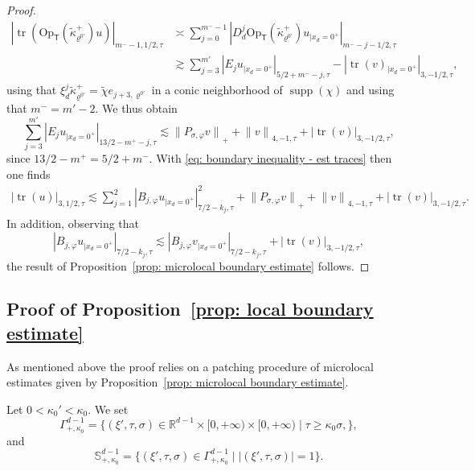 \documentclass[10pt]{amsart}
\let\sep\mid
\theoremstyle{plain}
\theoremstyle{definition}
\def\R{\mathbb{R}}
\newcommand{\nhd}{neighborhood\xspace}
\let\k\kappa
\let\y\varrho
\newcommand{\tk}{\tilde{\kappa}}
\newcommand{\tchi}{\tilde{\chi}}
\newcommand{\br}{\ensuremath{_{|x_d=0^+}}}
\newcommand{\Opt}{\ensuremath{\mathrm{Op}_{\scriptscriptstyle{\mathsf{T}}}}}
\newcommand{\Norm}[2]{{\| #1 \|}_{#2}}
\newcommand{\Normsc}[2]{{\| #1 \|}_{#2, \tau}}
\newcommand{\normsc}[2]{{| #1 |}_{#2, \tau}}
\newcommand{\Pconj}{P_{\sigma,\varphi}}
\DeclareMathOperator{\supp}{supp}
\DeclareMathOperator{\trace}{tr}
\begin{document}
\begin{proof}
\begin{align*}
\normsc{\trace(\Opt(\tk^+_{\y^{0\prime}}) u)}{m^--1, 1/2}
& \asymp \sum_{j=0}^{m^--1}
\normsc{D_d^j \Opt(\tk^+_{\y^{0\prime}}) u\br}{m^--j- 1/2}\\[-5pt]
& \gtrsim \sum_{j=3}^{m'}
\normsc{E_j u\br}{5/2+ m^--j} - \normsc{\trace(v)\br}{3, - 1/2} ,
\end{align*}
using that $\xi_d^j \tk^+_{\y^{0\prime}} = \tchi e_{j+3,
\y^{0\prime}}$ in a conic \nhd of $\supp(\chi)$ and using that
$m^- = m'-2$.
We thus obtain\vspace*{-3pt}
\begin{equation*}
\sum_{j=3}^{m'} \normsc{E_{j}u\br}{13/2-m^+-j}
\lesssim
\Norm{\Pconj v}{+}
+ \Normsc{v}{4,-1}
+ \normsc{\trace(v)}{3,-1/2},
\end{equation*}
since $13/2-m^+ = 5/2+ m^-$.
With \eqref{eq: boundary inequality - est traces} then one finds\vspace*{-3pt}
\begin{align*}
\normsc{\trace(u)}{3,1/2}
\lesssim \sum _{j=1}^{2} \normsc{B_{j, \varphi}u\br}{7/2-k_{j}}^2
+ \Norm{\Pconj v}{+}
+ \Normsc{v}{4,-1} + \normsc{\trace(v)}{3,-1/2}.
\end{align*}
In addition, observing that
\begin{equation*}
\normsc{B_{j, \varphi}u\br}{7/2-k_{j}}\lesssim
\normsc{B_{j, \varphi}v\br}{7/2-k_{j}} + \normsc{\trace(v)}{3,-1/2},
\end{equation*}
the result of Proposition~\ref{prop: microlocal boundary estimate}
follows.
\end{proof}

\subsection{Proof of Proposition~\ref{prop: local boundary estimate}}
\label{sec: proof prop: local boundary estimate}
As mentioned above the proof relies on a patching procedure of
microlocal estimates given by Proposition~\ref{prop: microlocal
boundary estimate}.

Let $0 < \k_0' < \k_0$.
We set
\begin{equation*}
\Gamma^{d-1}_{+, \k_0} = \{ (\xi',\tau,\sigma)\in\R^{d-1}\times [0,+\infty) \times
[0,+\infty)\sep \tau \geq \k_0 \sigma, \},
\end{equation*}
and
\begin{equation*}
\mathbb{S}^{d-1}_{+, \k_0} = \{ (\xi',\tau,\sigma)\in
\Gamma^{d-1}_{+, \k_0} \sep |(\xi',\tau,\sigma)|=1\}.
\end{equation*}
\end{document}
